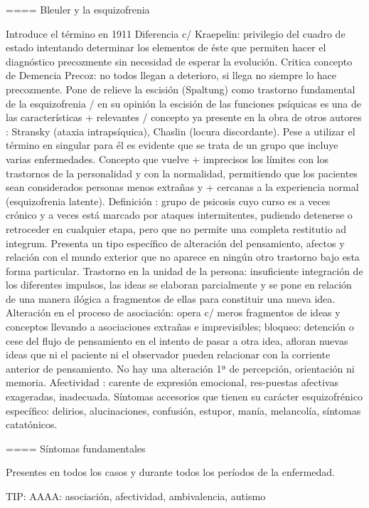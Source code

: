 \documentclass{scrbook}
\begin{document}
==== Bleuler y la esquizofrenia

Introduce el término en 1911 Diferencia c/ Kraepelin: privilegio del cuadro de estado intentando determinar los elementos de éste que permiten hacer el diagnóstico precozmente sin necesidad de esperar la evolución. Critica concepto de Demencia Precoz: no todos llegan a deterioro, si llega no siempre lo hace precozmente. Pone de relieve la escisión (Spaltung) como trastorno fundamental de la esquizofrenia / en su opinión la escisión de las funciones psíquicas es una de las características + relevantes / concepto ya presente en la obra de otros autores : Stransky (ataxia intrapsíquica), Chaslin (locura discordante). Pese a utilizar el término en singular para él es evidente que se trata de un grupo que incluye varias enfermedades. Concepto que vuelve + imprecisos los límites con los trastornos de la personalidad y con la normalidad, permitiendo que los pacientes sean considerados personas menos extrañas y + cercanas a la experiencia normal (esquizofrenia latente). 
Definición : grupo de psicosis cuyo curso es a veces crónico y a veces está marcado por ataques intermitentes, pudiendo detenerse o retroceder en cualquier etapa, pero que no permite una completa restitutio ad integrum. Presenta un tipo específico de alteración del pensamiento, afectos y relación con el mundo exterior que no aparece en ningún otro trastorno bajo esta forma particular. Trastorno en la unidad de la persona: insuficiente integración de los diferentes impulsos, las ideas se elaboran parcialmente y se pone en relación de una manera ilógica a fragmentos de ellas para constituir una nueva idea. Alteración en el proceso de asociación: opera c/ meros fragmentos de ideas y conceptos llevando a asociaciones extrañas e imprevisibles; bloqueo: detención o cese del flujo de pensamiento en el intento de pasar a otra idea, afloran nuevas ideas que ni el paciente ni el observador pueden relacionar con la corriente anterior de pensamiento. No hay una alteración 1ª de percepción, orientación ni memoria. Afectividad : carente de expresión emocional, res-puestas afectivas exageradas, inadecuada. Síntomas accesorios que tienen su carácter esquizofrénico específico: delirios, alucinaciones, confusión, estupor, manía, melancolía, síntomas catatónicos.

==== Síntomas fundamentales

Presentes en todos los casos y durante todos los períodos de la enfermedad.

TIP: AAAA: asociación, afectividad, ambivalencia, autismo
\end{document}
